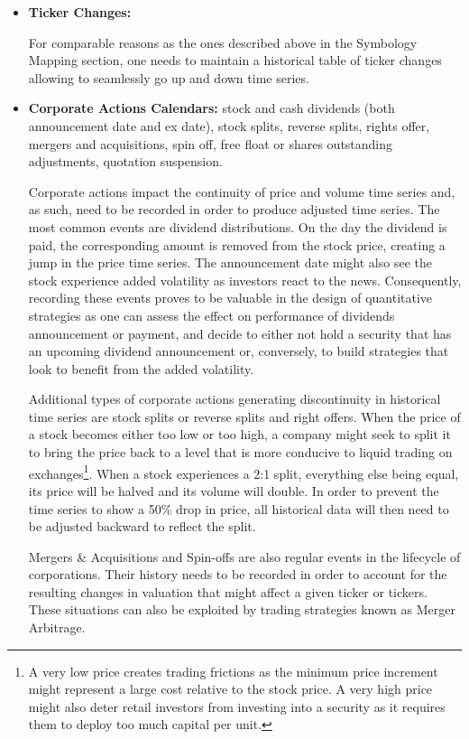 \begin{itemize}
\begin{itemize}
\end{itemize}

\item \textbf{Ticker Changes:} 

For comparable reasons as the ones described above in the Symbology Mapping section, one needs to maintain a historical table of ticker changes allowing to seamlessly go up and down time series. 


\item \textbf{Corporate Actions Calendars:} stock and cash dividends (both announcement date and ex date), stock splits, reverse splits, rights offer, mergers and acquisitions, spin off, free float or shares outstanding adjustments, quotation suspension.

Corporate actions impact the continuity of price and volume time series and, as such, need to be recorded in order to produce adjusted time series. The most common events are dividend distributions. On the day the dividend is paid, the corresponding amount is removed from the stock price, creating a jump in the price time series. The announcement date might also see the stock experience added volatility as investors react to the news. Consequently, recording these events proves to be valuable in the design of quantitative strategies as one can assess the effect on performance of dividends announcement or payment, and decide to either not hold a security that has an upcoming dividend announcement or, conversely, to build strategies that look to benefit from the added volatility. 

Additional types of corporate actions generating discontinuity in historical time series are stock splits or reverse splits and right offers. When the price of a stock becomes either too low or too high, a company might seek to split it to bring the price back to a level that is more conducive to liquid trading on exchanges\footnote{A very low price creates trading frictions as the minimum price increment might represent a large cost relative to the stock price. A very high price might also deter retail investors from investing into a security as it requires them to deploy too much capital per unit.}. When a stock experiences a 2:1 split, everything else being equal, its price will be halved and its volume will double. In order to prevent the time series to show a 50\% drop in price, all historical data will then need to be adjusted backward to reflect the split.

Mergers \& Acquisitions and Spin-offs are also regular events in the lifecycle of corporations. Their history needs to be recorded in order to account for the resulting changes in valuation that might affect a given ticker or tickers. These situations can also be exploited by trading strategies known as Merger Arbitrage.


\end{itemize}
